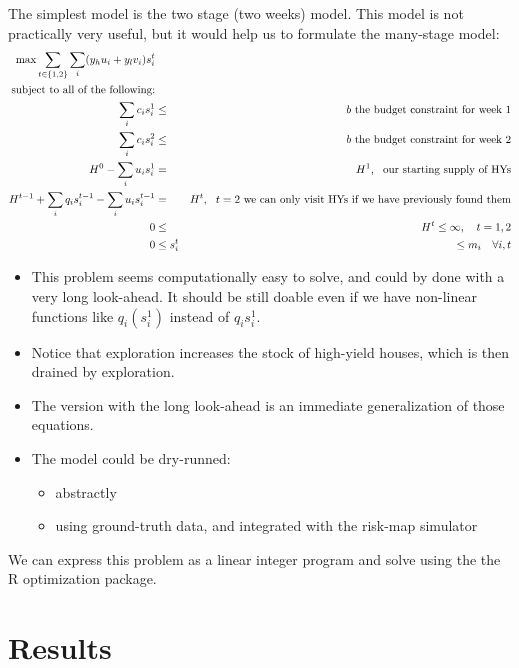 \documentclass[english]{paper}
\begin{document}
The simplest model is the two stage (two weeks) model. This model
is not practically very useful, but it would help us to formulate
the many-stage model:
\begin{eqnarray*}
\max\sum_{t\in\{1,2\}}\sum_{i}(y_{h}u_{i}+y_{l}v_{i})s_{i}^{t}\\
\mbox{subject to all of the following:}\\
\sum_{i}c_{i}s_{i}^{1} & \leq & b\mbox{ the budget constraint for week 1}\\
\sum_{i}c_{i}s_{i}^{2} & \leq & b\mbox{ the budget constraint for week 2}\\
H^{0}-\sum_{i}u_{i}s_{i}^{1} & = & H^{1},\mbox{ \,\,}\mbox{our starting supply of HYs}\\
H^{t-1}+\sum_{i}q_{i}s_{i}^{t-1}-\sum_{i}u_{i}s_{i}^{t-1} & = & H^{t},\mbox{ \,\,}t=2\mbox{ we can only visit HYs if we have previously found them}\\
0 & \leq & H^{t}\leq\infty,\mbox{ \,\,\,\,}t=1,2\\
0 & \leq s_{i}^{t} & \leq m_{i}\mbox{ \,\,\,\,}\forall i,t
\end{eqnarray*}

\begin{itemize}
\item This problem seems computationally easy to solve, and could by done
with a very long look-ahead. It should be still doable even if we
have non-linear functions like $q_{i}(s_{i}^{1})$ instead of $q_{i}s_{i}^{1}$.
\item Notice that exploration increases the stock of high-yield houses,
which is then drained by exploration.
\item The version with the long look-ahead is an immediate generalization
of those equations.
\item The model could be dry-runned:

\begin{itemize}
\item abstractly
\item using ground-truth data, and integrated with the risk-map simulator
\end{itemize}
\end{itemize}

We can express this problem as a linear integer program \cite{wolsey1998integer} and solve using the
the R optimization package.

\section{Results}
\end{document}
